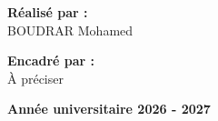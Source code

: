 \begin{titlepage}
\begin{center}
  \vspace{3cm}
\end{center}

\noindent
\begin{minipage}[t]{0.48\textwidth}
  {\color{reportbluedark}\bfseries Réalisé par :}\\
  BOUDRAR Mohamed
\end{minipage}%
\hfill
\begin{minipage}[t]{0.48\textwidth}

    {\color{reportbluedark}\bfseries Encadré par :}\\
    À préciser

  \end{minipage}

\vfill
\vspace{2.5cm}

\begin{center}
  {\bfseries Année universitaire 2026 - 2027}
\end{center}

\vspace{1cm}

\end{titlepage}
